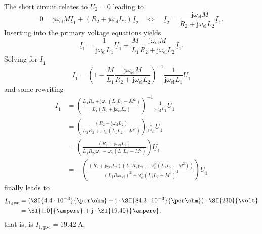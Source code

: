 \begin{solutionblock}
    The short circuit relates to $U_2=0$ leading to
    $$
    0 = \mathrm{j} \omega_\mathrm{el} M \underline{I}_1 + (R_2 + \mathrm{j}\omega_\mathrm{el} L_2)\underline{I}_2 \quad \Leftrightarrow \quad  \underline{I}_2 = \frac{-\mathrm{j} \omega_\mathrm{el} M }{R_2 + \mathrm{j}\omega_\mathrm{el} L_2} \underline{I}_1.
    $$
    Inserting into the primary voltage equations yields
    $$
    \underline{I}_1 = \frac{1}{\mathrm{j} \omega_\mathrm{el} L_1}\underline{U}_1 + \frac{M}{L_1} \frac{\mathrm{j} \omega_\mathrm{el} M }{R_2 + \mathrm{j}\omega_\mathrm{el} L_2} \underline{I}_1. 
    $$
    Solving for $\underline{I}_1$
    $$
    \underline{I}_1 = \left(1 - \frac{M}{L_1} \frac{\mathrm{j} \omega_\mathrm{el} M }{R_2 + \mathrm{j}\omega_\mathrm{el} L_2}\right)^{-1}\frac{1}{\mathrm{j} \omega_\mathrm{el} L_1}\underline{U}_1
    $$
    and some rewriting
    \begin{align*}
        \underline{I}_1 
        & =\left(\frac{L_1 R_2 +\mathrm{j} \omega_\mathrm{el} (L_1 L_2-M^2)}{L_1(R_2 + \mathrm{j}\omega_\mathrm{el} L_2)}\right)^{-1}\frac{1}{\mathrm{j} \omega_\mathrm{el} L_1}\underline{U}_1\\
        & =\left(\frac{(R_2 + \mathrm{j}\omega_\mathrm{el} L_2)}{L_1 R_2 +\mathrm{j} \omega_\mathrm{el} (L_1 L_2 -M^2)}\right)\frac{1}{\mathrm{j} \omega_\mathrm{el}}\underline{U}_1\\ 
        & =\left(\frac{(R_2 + \mathrm{j}\omega_\mathrm{el} L_2)}{L_1 R_2\mathrm{j}\omega_\mathrm{el} - \omega_\mathrm{el}^2 (L_1 L_2 -M^2)}\right)\underline{U}_1 \\
        & =-\left(\frac{(R_2 + \mathrm{j}\omega_\mathrm{el} L_2)(L_1 R_2\mathrm{j}\omega_\mathrm{el} + \omega_\mathrm{el}^2 (L_1 L_2 -M^2))}{(L_1 R_2\omega_\mathrm{el})^2 + \omega_\mathrm{el}^4 (L_1 L_2 -M^2)^2}\right)\underline{U}_1
    \end{align*}
finally leads to
\begin{align*}
\underline{I}_{1,\mathrm{psc}} &= (\SI{4.4\cdot 10^{-3}}{\per\ohm} + \mathrm{j}\cdot\SI{84.3\cdot 10^{-3}}{\per\ohm}) \cdot \SI{230}{\volt}\\
                              &= \SI{1.0}{\ampere} + \mathrm{j}\cdot\SI{19.40}{\ampere},
\end{align*}     
that is, is $I_{1,\mathrm{psc}} = \SI{19.42}{\ampere}$.
\end{solutionblock}

